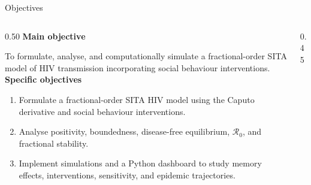 \documentclass[aspectratio=169,10pt]{beamer}
\newcommand{\Rzero}{\mathcal{R}_0}
\newcommand{\tagline}[1]{{\small\bfseries\color{Gold}#1}\par\vspace{0.10cm}}
\begin{document}
\begin{frame}{Objectives}
  \begin{columns}[T,onlytextwidth]
    \begin{column}{0.50\textwidth}
      \tagline{Main objective}
      To formulate, analyse, and computationally simulate a fractional-order SITA model of HIV transmission incorporating social behaviour interventions.
      \vspace{0.28cm}
      \tagline{Specific objectives}
      \begin{enumerate}
        \item Formulate a fractional-order SITA HIV model using the Caputo derivative and social behaviour interventions.
        \item Analyse positivity, boundedness, disease-free equilibrium, $\Rzero$, and fractional stability.
        \item Implement simulations and a Python dashboard to study memory effects, interventions, sensitivity, and epidemic trajectories.
      \end{enumerate}
    \end{column}
    \begin{column}{0.45\textwidth}
    \end{column}
  \end{columns}
\end{frame}
\end{document}
